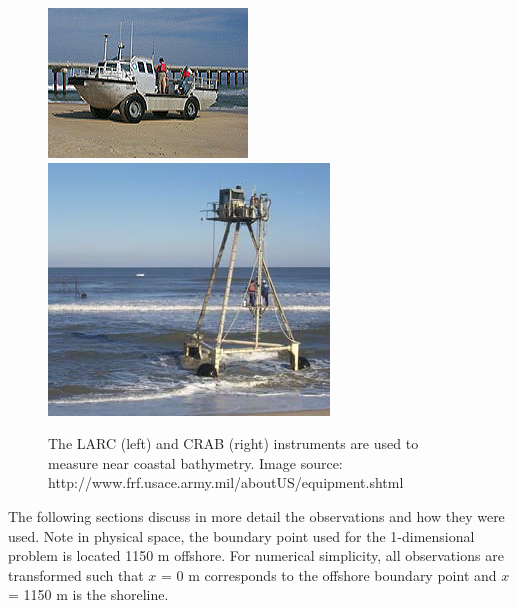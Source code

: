 \begin{figure}[h]
\includegraphics[width=.48\linewidth]{img/LARC.jpg}\hfill
\includegraphics[width=.48\linewidth]{img/CRAB2.JPG}
\caption{The LARC (left) and CRAB (right) instruments are used to measure near coastal bathymetry. Image source: http://www.frf.usace.army.mil/aboutUS/equipment.shtml}
\label{crablarc}
\end{figure}

The following sections discuss in more detail the observations and how they were used. Note in physical space, the boundary point used for the 1-dimensional problem is located 1150 m offshore. For numerical simplicity, all observations are transformed such that $\textit{x}$ = 0 m corresponds to the offshore boundary point and $\textit{x}$ = 1150 m is the shoreline. 

